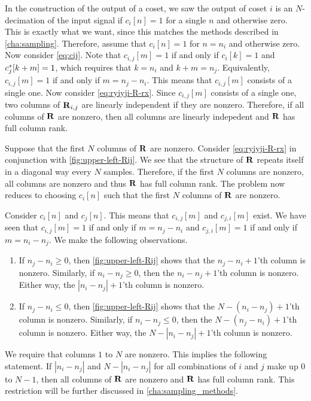 \documentclass[a4paper, openany, oneside]{memoir}
\begin{document}
In the construction of the output of a coset, we saw the output of coset $i$ is an $N$-decimation of the input signal if $c_i[n]=1$ for a single $n$ and otherwise zero. This is exactly what we want, since this matches the methods described in \cref{cha:sampling}. Therefore, assume that $c_i[n]=1$ for $n=n_i$ and otherwise zero. Now consider \cref{eq:cij}. Note that $c_{i,j}[m]=1$ if and only if $c_i[k]=1$ and $c^*_j[k+m]=1$, which requires that $k = n_i$ and $k+m = n_j$. Equivalently, $c_{i,j}[m]=1$ if and only if $m = n_j - n_i$. This means that $c_{i,j}[m]$ consists of a single one. Now consider \cref{eq:ryiyji-R-rx}. Since $c_{i,j}[m]$ consists of a single one, two columns of $\boldsymbol{\mathbf{R}}_{i,j}$ are linearly independent if they are nonzero. Therefore, if all columns of $\boldsymbol{\mathbf{R}}$ are nonzero, then all columns are linearly indepedent and $\boldsymbol{\mathbf{R}}$ has full column rank.

Suppose that the first $N$ columns of $\boldsymbol{\mathbf{R}}$ are nonzero. Consider \cref{eq:ryiyji-R-rx} in conjunction with \cref{fig:upper-left-Rij}. We see that the structure of $\boldsymbol{\mathbf{R}}$ repeats itself in a diagonal way every $N$ samples. Therefore, if the first $N$ columns are nonzero, all columns are nonzero and thus $\boldsymbol{\mathbf{R}}$ has full column rank. The problem now reduces to choosing $c_i[n]$ such that the first $N$ columns of $\boldsymbol{\mathbf{R}}$ are nonzero.

Consider $c_i[n]$ and $c_j[n]$. This means that $c_{i,j}[m]$ and $c_{j,i}[m]$ exist. We have seen that $c_{i,j}[m]=1$ if and only if $m=n_j-n_i$ and $c_{j,i}[m]=1$ if and only if $m=n_i-n_j$. We make the following observations.
\begin{enumerate}
    \item If $n_j-n_i \ge 0$, then \cref{fig:upper-left-Rij} shows that the $n_j-n_i+1$'th column is nonzero. Similarly, if $n_i - n_j \ge 0$, then the $n_i-n_j+1$'th column is nonzero. Either way, the $|n_i - n_j| + 1$'th column is nonzero.
    \item If $n_j-n_i \le 0$, then \cref{fig:upper-left-Rij} shows that the $N-(n_i-n_j)+1$'th column is nonzero. Similarly, if $n_i - n_j \le 0$, then the $N-(n_j-n_i)+1$'th column is nonzero. Either way, the $N-|n_i-n_j|+1$'th column is nonzero.
\end{enumerate}
We require that columns $1$ to $N$ are nonzero. This implies the following statement. If $|n_i - n_j|$ and $N-|n_i-n_j|$ for all combinations of $i$ and $j$ make up $0$ to $N-1$, then all columns of $\boldsymbol{\mathbf{R}}$ are nonzero and $\boldsymbol{\mathbf{R}}$ has full column rank. This restriction will be further discussed in \ref{cha:sampling_methods}.
\end{document}

